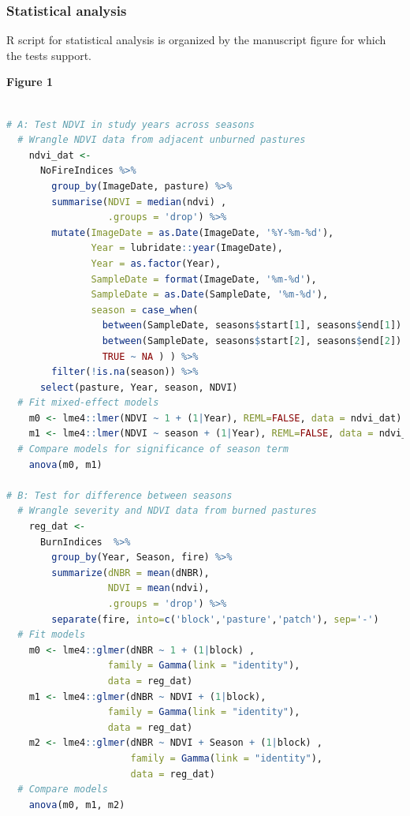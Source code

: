 \documentclass[
]{article}
\begin{document}
\subsubsection{Statistical analysis}\label{statistical-analysis}

\textsf{R} script for statistical analysis is organized by the
manuscript figure for which the tests support.

\textbf{Figure 1}

\begin{lstlisting}[language=R]

# A: Test NDVI in study years across seasons 
  # Wrangle NDVI data from adjacent unburned pastures
    ndvi_dat <-
      NoFireIndices %>%
        group_by(ImageDate, pasture) %>%
        summarise(NDVI = median(ndvi) , 
                  .groups = 'drop') %>%
        mutate(ImageDate = as.Date(ImageDate, '%Y-%m-%d'), 
               Year = lubridate::year(ImageDate), 
               Year = as.factor(Year), 
               SampleDate = format(ImageDate, '%m-%d'), 
               SampleDate = as.Date(SampleDate, '%m-%d'), 
               season = case_when(
                 between(SampleDate, seasons$start[1], seasons$end[1]) ~ 'Spring',
                 between(SampleDate, seasons$start[2], seasons$end[2]) ~ 'Summer', 
                 TRUE ~ NA ) ) %>%
        filter(!is.na(season)) %>%
      select(pasture, Year, season, NDVI)
  # Fit mixed-effect models
    m0 <- lme4::lmer(NDVI ~ 1 + (1|Year), REML=FALSE, data = ndvi_dat) 
    m1 <- lme4::lmer(NDVI ~ season + (1|Year), REML=FALSE, data = ndvi_dat)
  # Compare models for significance of season term
    anova(m0, m1)
  
# B: Test for difference between seasons
  # Wrangle severity and NDVI data from burned pastures
    reg_dat <-
      BurnIndices  %>%
        group_by(Year, Season, fire) %>%
        summarize(dNBR = mean(dNBR), 
                  NDVI = mean(ndvi), 
                  .groups = 'drop') %>%
        separate(fire, into=c('block','pasture','patch'), sep='-')
  # Fit models
    m0 <- lme4::glmer(dNBR ~ 1 + (1|block) , 
                  family = Gamma(link = "identity"), 
                  data = reg_dat)
    m1 <- lme4::glmer(dNBR ~ NDVI + (1|block), 
                  family = Gamma(link = "identity"), 
                  data = reg_dat)
    m2 <- lme4::glmer(dNBR ~ NDVI + Season + (1|block) , 
                      family = Gamma(link = "identity"), 
                      data = reg_dat)
  # Compare models
    anova(m0, m1, m2)

\end{lstlisting}
\end{document}
